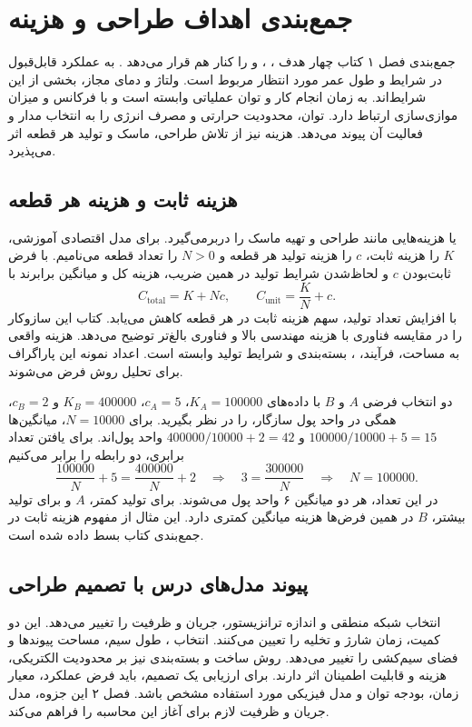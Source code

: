 \section*{جمع‌بندی اهداف طراحی و هزینه}
{}
\label{sec:book-objectives}
جمع‌بندی فصل ۱ کتاب چهار هدف ، ، 
و  را کنار هم قرار می‌دهد \cite[صفحات چاپی ۵۵ و ۵۶]{weste}.
 به عملکرد قابل‌قبول در شرایط و طول عمر مورد انتظار مربوط است.
ولتاژ و دمای مجاز، بخشی از این شرایط‌اند.
 به زمان انجام کار و توان عملیاتی وابسته است و با فرکانس
 و میزان موازی‌سازی ارتباط دارد.
توان، محدودیت حرارتی و مصرف انرژی را به انتخاب مدار و فعالیت آن پیوند می‌دهد.
هزینه نیز از تلاش طراحی، ماسک و تولید هر قطعه اثر می‌پذیرد.

\subsection*{هزینه ثابت و هزینه هر قطعه}
 یا  هزینه‌هایی مانند طراحی و تهیه ماسک
را دربرمی‌گیرد. برای مدل اقتصادی آموزشی، \(K\) را هزینه ثابت، \(c\) را هزینه
تولید هر قطعه و \(N>0\) را تعداد قطعه می‌نامیم.
با فرض ثابت‌بودن \(c\) و لحاظ‌شدن شرایط تولید در همین ضریب، هزینه کل و میانگین برابرند با
\begin{equation}
 C_{\mathrm{total}}=K+Nc,\qquad
 C_{\mathrm{unit}}=\frac{K}{N}+c.
 \label{eq:booklet-nre}
\end{equation}
با افزایش تعداد تولید، سهم هزینه ثابت در هر قطعه کاهش می‌یابد.
کتاب این سازوکار را در مقایسه فناوری با هزینه مهندسی بالا و فناوری بالغ‌تر
توضیح می‌دهد. هزینه واقعی به مساحت، فرآیند، ، بسته‌بندی و شرایط تولید
وابسته است. اعداد نمونه این پاراگراف برای تحلیل روش فرض می‌شوند.

دو انتخاب فرضی \(A\) و \(B\) با داده‌های
\(K_A=100000\)، \(c_A=5\)، \(K_B=400000\) و \(c_B=2\)، همگی در واحد پول
سازگار، را در نظر بگیرید.
برای \(N=10000\)، میانگین‌ها \(100000/10000+5=15\) و
\(400000/10000+2=42\) واحد پول‌اند.
برای یافتن تعداد برابری، دو رابطه را برابر می‌کنیم
\begin{equation*}
 \frac{100000}{N}+5=\frac{400000}{N}+2
 \quad\Longrightarrow\quad
 3=\frac{300000}{N}
 \quad\Longrightarrow\quad N=100000.
\end{equation*}
در این تعداد، هر دو میانگین ۶ واحد پول می‌شوند.
برای تولید کمتر، \(A\) و برای تولید بیشتر، \(B\) در همین فرض‌ها هزینه میانگین
کمتری دارد. این مثال از مفهوم هزینه ثابت در جمع‌بندی کتاب بسط داده شده است.

\subsection*{پیوند مدل‌های درس با تصمیم طراحی}
انتخاب شبکه منطقی و اندازه ترانزیستور، جریان و ظرفیت را تغییر می‌دهد.
این دو کمیت، زمان شارژ و تخلیه را تعیین می‌کنند.
انتخاب ، طول سیم، مساحت پیوندها و فضای سیم‌کشی را تغییر می‌دهد.
روش ساخت و بسته‌بندی نیز بر محدودیت الکتریکی، هزینه و قابلیت اطمینان اثر دارند.
برای ارزیابی یک تصمیم، باید فرض عملکرد، معیار زمان، بودجه توان و مدل فیزیکی
مورد استفاده مشخص باشد.
فصل ۲ این جزوه، مدل جریان و ظرفیت لازم برای آغاز این محاسبه را فراهم می‌کند.
\clearpage
